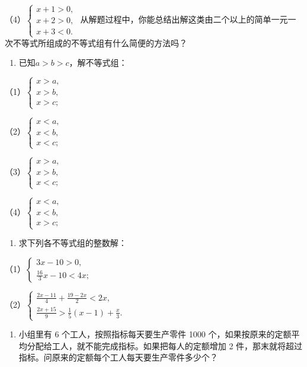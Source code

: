 （4）\(\left\{ \begin{array}{l} x + 1 > 0, \\ x + 2 > 0, \\ x + 3 < 0. \end{array} \right.\)
从解题过程中，你能总结出解这类由二个以上的简单一元一次不等式所组成的不等式组有什么简便的方法吗？

\begin{enumerate}[start=2]
\item
  已知\(a > b > c\)，解不等式组：
\end{enumerate}

（1）\(\left\{ \begin{array}{l} x > a, \\ x > b, \\ x > c; \end{array} \right.\)

（2）\(\left\{ \begin{array}{l} x < a, \\ x < b, \\ x < c; \end{array} \right.\)

（3）\(\left\{ \begin{array}{l} x > a, \\ x > b, \\ x < c; \end{array} \right.\)

（4）\(\left\{ \begin{array}{l} x < a, \\ x < b, \\ x > c; \end{array} \right.\)

\begin{enumerate}[start=3]
\item
  求下列各不等式组的整数解：
\end{enumerate}

（1）\(\left\{ \begin{array}{l} 3x - 10 > 0, \\ \frac{16}{3} x - 10 < 4x; \end{array} \right.\)

（2）\(\left\{ \begin{array}{l} \frac{2x - 11}{4} + \frac{19 - 2x}{2} < 2x, \\ \frac{2x + 15}{9} > \frac{1}{5}(x - 1) + \frac{x}{3}. \end{array} \right.\)

\begin{enumerate}[start=4]
\item
  小组里有 6 个工人，按照指标每天要生产零件 1000
  个，如果按原来的定额平均分配给工人，就不能完成指标。如果把每人的定额增加
  2 件，那末就将超过指标。问原来的定额每个工人每天要生产零件多少个？
\end{enumerate}

